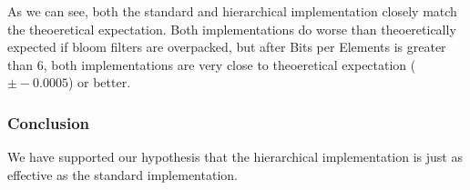As we can see, both the standard and hierarchical implementation closely match the theoeretical expectation. 
Both implementations do worse than theoeretically expected if bloom filters are overpacked, but after Bits per Elements is greater than 6, both implementations are very close to theoeretical expectation ($\pm -0.0005$) or better.

\subsubsection{Conclusion}
We have supported our hypothesis that the hierarchical implementation is just as effective as the standard implementation. 
